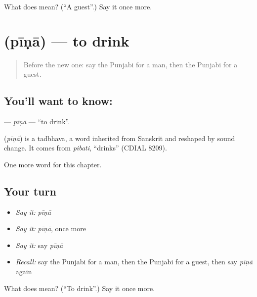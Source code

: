 \begin{tcolorbox}[breakable,colback=teal!4,colframe=teal!35!black,title={Before you move on}]
What does  mean? (\textquotedblleft{}A guest\textquotedblright{}.) Say it once more.
\end{tcolorbox}
\section[\texorpdfstring{\pa{ਪੀਣਾ} (pīṇā)}{ਪੀਣਾ (pīṇā)}]{ (pīṇā) — to drink}

\label{lesson:PA-C56-pina}



\begin{quote}
Before the new one: say the Punjabi for a man, then the Punjabi for a guest.
\end{quote}

\subsection*{You'll want to know: }
\textbf{} — \emph{pīṇā} — \textquotedblleft{}to drink\textquotedblright{}.

\begin{cousinweb}
\textbf{} (\emph{pīṇā}) is a tadbhava, a word inherited from Sanskrit and reshaped by sound change. It comes from \emph{pibati}, \textquotedblleft{}drinks\textquotedblright{} (CDIAL 8209).
\end{cousinweb}

\begin{grammarlens}[title={What you've built}]
One more word for this chapter.
\end{grammarlens}

\subsection*{Your turn}
\begin{itemize}
\raggedright
  \item \emph{Say it:} \emph{pīṇā}
  \item \emph{Say it:} \emph{pīṇā}, once more
  \item \emph{Say it:} say \emph{pīṇā}
  \item \emph{Recall:} say the Punjabi for a man, then the Punjabi for a guest, then say \emph{pīṇā} again
\end{itemize}

\begin{tcolorbox}[breakable,colback=teal!4,colframe=teal!35!black,title={Before you move on}]
What does  mean? (\textquotedblleft{}To drink\textquotedblright{}.) Say it once more.
\end{tcolorbox}
